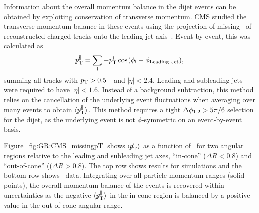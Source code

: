 Information about the overall momentum balance in the dijet events can be obtained by exploiting
conservation of transverse momentum. CMS studied the transverse momentum balance in these events
using the projection of missing \pT\ of reconstructed charged tracks onto the leading 
jet axis~\cite{Chatrchyan:2011sx}. 
Event-by-event, this was calculated as 
\begin{equation}
\displaystyle{\not} p_{\mathrm{T}}^{\parallel} =
\sum_{\rm i}{ -p_{\mathrm{T}}^{\rm i}\cos{(\phi_{\rm i}-\phi_{\rm Leading\ Jet})}},
\end{equation}
summing all tracks with $\mbox{$p_{\mathrm{T}}$} > 0.5$~\GeVc\ and $|\eta| < 2.4$. 
Leading and subleading jets were required to have $|\eta| < 1.6$.
Instead of a background subtraction, this method relies on the cancellation of the 
underlying event fluctuations when averaging over many events to obtain 
$\langle \displaystyle{\not} p_{\mathrm{T}}^{\parallel} \rangle$.
This method requires a tight $\Delta\phi_{1,2} > 5 \pi/6$ selection for the dijet, as the underlying 
event is not $\phi$-symmetric on an event-by-event basis.

Figure~\ref{fig:GR:CMS_missingpT} shows $\langle \displaystyle{\not} p_{\mathrm{T}}^{\parallel} \rangle$
as a function of \AJ\ for two angular regions relative to the leading and subleading 
jet axes, ``in-cone'' ($\Delta R < 0.8$) and ``out-of-cone'' (($\Delta R > 0.8$). 
The top row shows results for  {} simulations and the bottom row shows
\PbPb\ data. Integrating over all particle momentum ranges (solid points),
 the overall momentum balance of the events is recovered within uncertainties 
as the negative $\langle \displaystyle{\not} p_{\mathrm{T}}^{\parallel} \rangle$ in 
the in-cone region is balanced by a positive value in the out-of-cone angular range.

